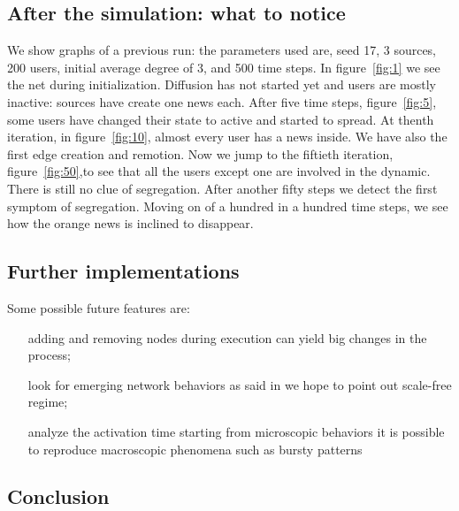 \subsection{After the simulation: what to notice}\label{subsec:after}
We show graphs of a previous run: the parameters used are, seed 17, 3 sources,
200 users, initial average degree of 3, and 500 time steps.
In figure~\ref{fig:1} we see the net during initialization. Diffusion
has not started yet and users are mostly inactive:
sources have create one news each.
After five time steps, figure~\ref{fig:5}, some users have changed their state
to active and started to spread.
At thenth iteration, in figure~\ref{fig:10}, almost every user
has a news inside. We have also the first edge creation and remotion.
Now we jump to the fiftieth iteration, figure~\ref{fig:50},to see that
all the users except one are involved in the dynamic. There is still no
clue of segregation.
After another fifty steps we detect the first symptom of segregation.
Moving on of a hundred in a hundred time steps, we see how the orange news
is inclined to disappear.

\subsection{Further implementations}\label{subsec:implementations}
Some possible future features are:
\begin{itemize}
\item [adding and removing nodes during execution] can yield big changes
  in the process;
\item [look for emerging network behaviors] as said in \textit{} we hope to point out scale-free regime;
\item [analyze the activation time] starting from microscopic behaviors
  it is possible to reproduce macroscopic phenomena such as bursty
  patterns\cite{goh_burstiness_2008}
\end{itemize}

\subsection{Conclusion}\label{subsec:conclusion}







